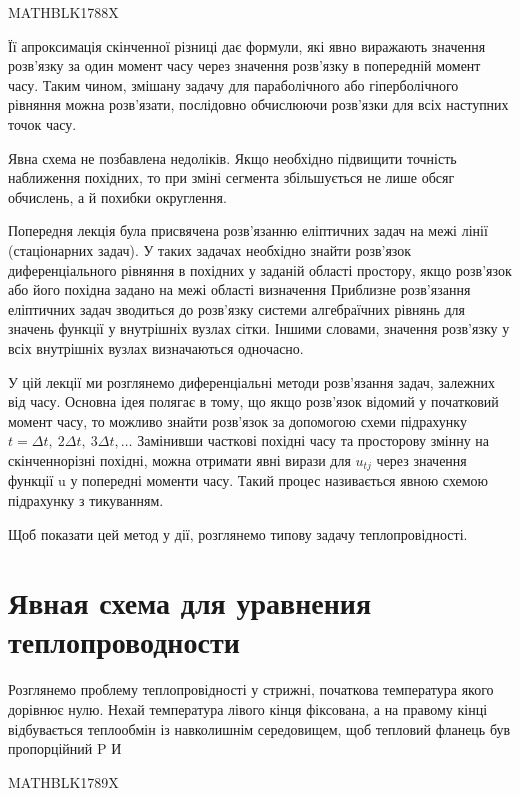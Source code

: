 \documentclass[
  ukrainian,
]{article}
\begin{document}
MATHBLK1788X

Її апроксимація скінченної різниці дає формули, які явно виражають
значення розв'язку за один момент часу через значення розв'язку в
попередній момент часу. Таким чином, змішану задачу для параболічного
або гіперболічного рівняння можна розв'язати, послідовно обчислюючи
розв'язки для всіх наступних точок часу.

Явна схема не позбавлена недоліків. Якщо необхідно підвищити точність
наближення похідних, то при зміні сегмента збільшується не лише обсяг
обчислень, а й похибки округлення.

Попередня лекція була присвячена розв'язанню еліптичних задач на межі
лінії (стаціонарних задач). У таких задачах необхідно знайти розв'язок
диференціального рівняння в похідних у заданій області простору, якщо
розв'язок або його похідна задано на межі області визначення Приблизне
розв'язання еліптичних задач зводиться до розв'язку системи алгебраїчних
рівнянь для значень функції у внутрішніх вузлах сітки. Іншими словами,
значення розв'язку у всіх внутрішніх вузлах визначаються одночасно.

У цій лекції ми розглянемо диференціальні методи розв'язання задач,
залежних від часу. Основна ідея полягає в тому, що якщо розв'язок
відомий у початковий момент часу, то можливо знайти розв'язок за
допомогою схеми підрахунку \(t=\Delta t,\ 2\Delta t,\ 3\Delta t,\ldots\)
Замінивши часткові похідні часу та просторову змінну на скінченнорізні
похідні, можна отримати явні вирази для \(u_{tj}\) через значення
функції u у попередні моменти часу. Такий процес називається явною
схемою підрахунку з тикуванням.

Щоб показати цей метод у дії, розглянемо типову задачу теплопровідності.

\section{Явная схема для уравнения
теплопроводности}\label{ux44fux432ux43dux430ux44f-ux441ux445ux435ux43cux430-ux434ux43bux44f-ux443ux440ux430ux432ux43dux435ux43dux438ux44f-ux442ux435ux43fux43bux43eux43fux440ux43eux432ux43eux434ux43dux43eux441ux442ux438}

Розглянемо проблему теплопровідності у стрижні, початкова температура
якого дорівнює нулю. Нехай температура лівого кінця фіксована, а на
правому кінці відбувається теплообмін із навколишнім середовищем, щоб
тепловий фланець був пропорційний P И

MATHBLK1789X
\end{document}
